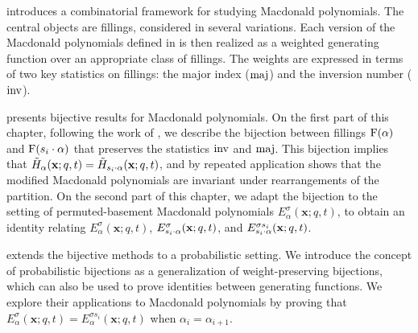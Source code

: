  introduces a combinatorial framework for studying Macdonald polynomials.  
The central objects are fillings, considered in several variations.  
Each version of the Macdonald polynomials defined in 
is then realized as a weighted generating function over an appropriate class of fillings.
The weights are expressed in terms of two key statistics on fillings:
the major index (\(\maj\)) and the inversion number (\(\inv\)).

 presents bijective results for Macdonald polynomials.
On the first part of this chapter, following the work of \cite{KLO22},
we describe the bijection between fillings \(\Fill(\alpha)\) and \(\Fill(s_i \permact \alpha)\)
that preserves the statistics \(\inv\) and \(\maj\).
This bijection implies that \(\tilde{H}_\alpha(\mathbf{x};q,t) = \tilde{H}_{s_i \cdot \alpha}(\mathbf{x};q,t)\),
and by repeated application shows that the modified Macdonald polynomials are invariant under rearrangements of the partition.
On the second part of this chapter, we adapt the bijection to the setting of
permuted-basement Macdonald polynomials \(E_\alpha^\sigma(\mathbf{x};q,t)\),
to obtain an identity relating \(E_\alpha^\sigma(\mathbf{x};q,t)\),
\(E_{s_i \cdot \alpha}^\sigma(\mathbf{x};q,t)\),
and \(E_{s_i \cdot \alpha}^{\sigma s_i}(\mathbf{x};q,t)\).

 extends the bijective methods to a probabilistic setting.
We introduce the concept of probabilistic bijections as a generalization of weight-preserving bijections,
which can also be used to prove identities between generating functions.
We explore their applications to Macdonald polynomials by proving that \(E_\alpha^\sigma(\mathbf{x};q,t) = E_\alpha^{\sigma s_i}(\mathbf{x};q,t)\) when \(\alpha_i = \alpha_{i+1}\).